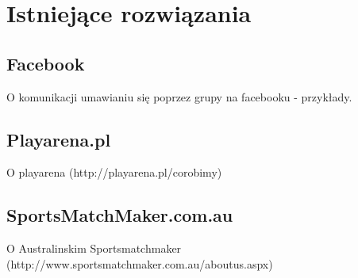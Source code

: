 \chapter{Istniejące rozwiązania}

\section{Facebook}

O komunikacji umawianiu się poprzez grupy na facebooku - przykłady.

\section{Playarena.pl}

O playarena (http://playarena.pl/corobimy)

\section{SportsMatchMaker.com.au}

O Australinskim Sportsmatchmaker (http://www.sportsmatchmaker.com.au/aboutus.aspx)

